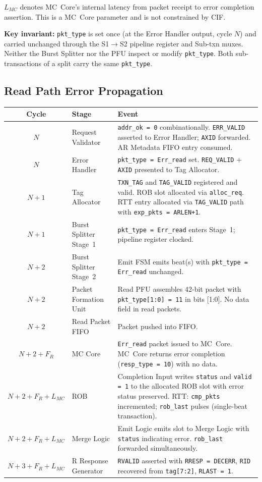 \documentclass[11pt,a4paper]{article}
\begin{document}
$L_{MC}$ denotes MC~Core's internal latency from packet receipt to error
completion assertion. This is a MC~Core parameter and is not constrained by
CIF.

\textbf{Key invariant:} \texttt{pkt\_type} is set once (at the Error Handler
output, cycle $N$) and carried unchanged through the S1$\rightarrow$S2 pipeline
register and Sub-txn muxes. Neither the Burst Splitter nor the PFU inspect or
modify \texttt{pkt\_type}. Both sub-transactions of a split carry the same
\texttt{pkt\_type}.

\subsection{Read Path Error Propagation}

\begin{center}
\begin{tabular}{clL{9cm}}
\toprule
\textbf{Cycle} & \textbf{Stage} & \textbf{Event} \\
\midrule
$N$   & Request Validator & \texttt{addr\_ok = 0} combinationally. \texttt{ERR\_VALID} asserted to Error Handler; \texttt{AXID} forwarded. AR Metadata FIFO entry consumed. \\
$N$   & Error Handler     & \texttt{pkt\_type = Err\_read} set. \texttt{REQ\_VALID} + \texttt{AXID} presented to Tag Allocator. \\
$N+1$ & Tag Allocator     & \texttt{TXN\_TAG} and \texttt{TAG\_VALID} registered and valid. ROB slot allocated via \texttt{alloc\_req}. RTT entry allocated via \texttt{TAG\_VALID} path with \texttt{exp\_pkts = ARLEN+1}. \\
$N+1$ & Burst Splitter Stage~1 & \texttt{pkt\_type = Err\_read} enters Stage~1; pipeline register clocked. \\
$N+2$ & Burst Splitter Stage~2 & Emit FSM emits beat(s) with \texttt{pkt\_type = Err\_read} unchanged. \\
$N+2$ & Packet Formation Unit & Read PFU assembles 42-bit packet with \texttt{pkt\_type[1:0] = 11} in bits [1:0]. No data field in read packets. \\
$N+2$ & Read Packet FIFO  & Packet pushed into FIFO. \\
$N+2 + F_R$ & MC Core & \texttt{Err\_read} packet issued to MC~Core. MC~Core returns error completion (\texttt{resp\_type = 10}) with no data. \\
$N+2 + F_R + L_{MC}$ & ROB & Completion Input writes \texttt{status} and \texttt{valid = 1} to the allocated ROB slot with error status preserved. RTT: \texttt{cmp\_pkts} incremented; \texttt{rob\_last} pulses (single-beat transaction). \\
$N+2 + F_R + L_{MC}$ & Merge Logic & Emit Logic emits slot to Merge Logic with \texttt{status} indicating error. \texttt{rob\_last} forwarded simultaneously. \\
$N+3 + F_R + L_{MC}$ & R Response Generator & \texttt{RVALID} asserted with \texttt{RRESP = DECERR}, \texttt{RID} recovered from \texttt{tag[7:2]}, \texttt{RLAST = 1}. \\
\bottomrule
\end{tabular}
\end{center}
\end{document}
